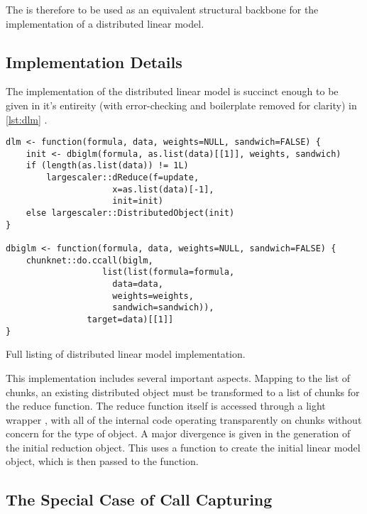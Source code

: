 The  is therefore to be used as an equivalent structural backbone for the implementation of a distributed linear model.

\subsection{Implementation Details}

The implementation of the distributed linear model is succinct enough to be given in it's entireity (with error-checking and boilerplate removed for clarity) in \cref{lst:dlm} .

\begin{listing}
	\begin{verbatim}
dlm <- function(formula, data, weights=NULL, sandwich=FALSE) {
	init <- dbiglm(formula, as.list(data)[[1]], weights, sandwich)
	if (length(as.list(data)) != 1L)
		largescaler::dReduce(f=update,
				     x=as.list(data)[-1],
				     init=init)
	else largescaler::DistributedObject(init)
}

dbiglm <- function(formula, data, weights=NULL, sandwich=FALSE) {
	chunknet::do.ccall(biglm,
		           list(list(formula=formula,
				     data=data,
				     weights=weights,
				     sandwich=sandwich)),
			    target=data)[[1]]
}
\end{verbatim}
\caption{Full listing of distributed linear model implementation.}
\label{lst:dlm}
\end{listing}

This implementation includes several important aspects.
Mapping to the list of chunks, an existing distributed object must be transformed to a list of chunks for the reduce function.
The reduce function itself is accessed through a light wrapper , with all of the internal code operating transparently on chunks without concern for the type of object.
A major divergence is given in the generation of the initial reduction object.
This uses a  function to create the initial  linear model object, which is then passed to the  function.

\subsection{The Special Case of Call Capturing}

